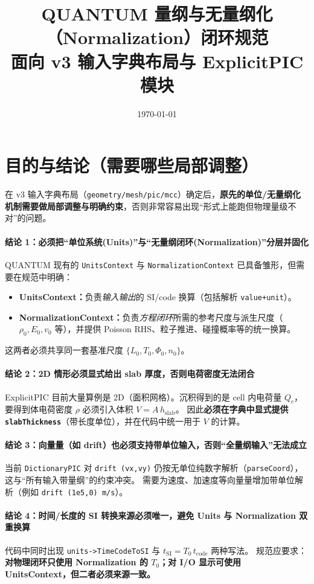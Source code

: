 \documentclass[11pt,a4paper]{ctexart}
\title{QUANTUM 量纲与无量纲化（Normalization）闭环规范\\\small 面向 v3 输入字典布局与 ExplicitPIC 模块}
\author{}
\date{\today}
\begin{document}
\maketitle

\section{目的与结论（需要哪些局部调整）}
在 v3 输入字典布局（\texttt{geometry/mesh/pic/mcc}）确定后，\textbf{原先的单位/无量纲化机制需要做局部调整与明确约束}，否则非常容易出现“形式上能跑但物理量级不对”的问题。

\paragraph{结论 1：必须把“单位系统(Units)”与“无量纲闭环(Normalization)”分层并固化}
QUANTUM 现有的 \texttt{UnitsContext} 与 \texttt{NormalizationContext} 已具备雏形，但需要在规范中明确：
\begin{itemize}[leftmargin=2em]
  \item \textbf{UnitsContext：}负责\emph{输入输出}的 SI/code 换算（包括解析 \texttt{value+unit}）。
  \item \textbf{NormalizationContext：}负责\emph{方程闭环}所需的参考尺度与派生尺度（$\rho_0,E_0,v_0$ 等），并提供 Poisson RHS、粒子推进、碰撞概率等的统一换算。
\end{itemize}
这两者必须共享同一套基准尺度 $\{L_0,T_0,\Phi_0,n_0\}$。

\paragraph{结论 2：2D 情形必须显式给出 slab 厚度，否则电荷密度无法闭合}
ExplicitPIC 目前大量算例是 2D（面积网格）。沉积得到的是 cell 内电荷量 $Q_c$，要得到体电荷密度 $\rho$ 必须引入体积 $V=A\,h_\mathrm{slab}$。
因此\textbf{必须在字典中显式提供 \texttt{slabThickness}}（带长度单位），并在代码中统一用于 $V$ 的计算。

\paragraph{结论 3：向量量（如 drift）也必须支持带单位输入，否则“全量纲输入”无法成立}
当前 \texttt{DictionaryPIC} 对 \texttt{drift (vx,vy)} 仍按无单位纯数字解析（\texttt{parseCoord}），这与“所有输入带量纲”的约束冲突。
需要为速度、加速度等向量量增加带单位解析（例如 \texttt{drift (1e5,0) m/s}）。

\paragraph{结论 4：时间/长度的 SI 转换来源必须唯一，避免 Units 与 Normalization 双重换算}
代码中同时出现 \texttt{units->TimeCodeToSI} 与 $t_{\mathrm{SI}}=T_0\,t_{\mathrm{code}}$ 两种写法。
规范应要求：\textbf{对物理闭环只使用 Normalization 的 $T_0$；对 I/O 显示可使用 UnitsContext，但二者必须来源一致。}
\end{document}

